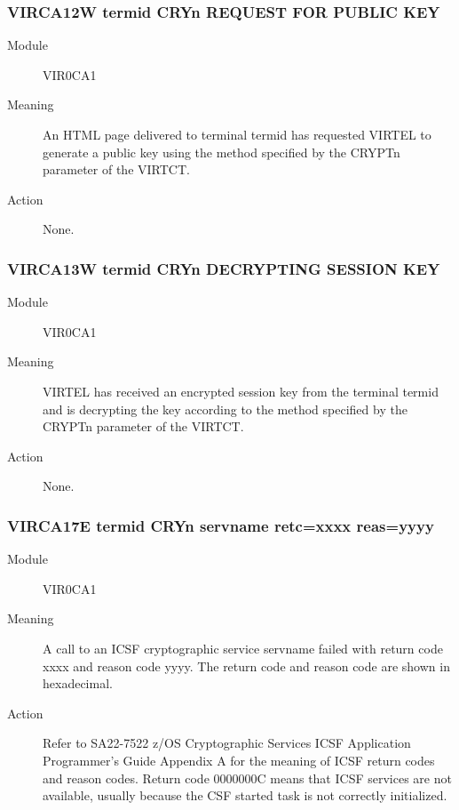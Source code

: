 \documentclass[letterpaper,10pt,english]{sphinxmanual}
\begin{document}
\subsubsection{VIRCA12W termid CRYn REQUEST FOR PUBLIC KEY}
\label{\detokenize{messages:virca12w-termid-cryn-request-for-public-key}}\begin{description}
\item[{Module}] \leavevmode
VIR0CA1

\item[{Meaning}] \leavevmode
An HTML page delivered to terminal termid has requested VIRTEL to generate a public key using the method specified by the CRYPTn parameter of the VIRTCT.

\item[{Action}] \leavevmode
None.

\end{description}


\subsubsection{VIRCA13W termid CRYn DECRYPTING SESSION KEY}
\label{\detokenize{messages:virca13w-termid-cryn-decrypting-session-key}}\begin{description}
\item[{Module}] \leavevmode
VIR0CA1

\item[{Meaning}] \leavevmode
VIRTEL has received an encrypted session key from the terminal termid and is decrypting the key according to the method specified by the CRYPTn parameter of the VIRTCT.

\item[{Action}] \leavevmode
None.

\end{description}


\subsubsection{VIRCA17E termid CRYn  servname retc=xxxx reas=yyyy}
\label{\detokenize{messages:virca17e-termid-cryn-error-servname-retc-xxxx-reas-yyyy}}\begin{description}
\item[{Module}] \leavevmode
VIR0CA1

\item[{Meaning}] \leavevmode
A call to an ICSF cryptographic service servname failed with return code xxxx and reason code yyyy. The return code and reason code are shown in hexadecimal.

\item[{Action}] \leavevmode
Refer to SA22-7522 z/OS Cryptographic Services ICSF Application Programmer’s Guide Appendix A for the meaning of ICSF return codes and reason codes. Return code 0000000C means that ICSF services are not available, usually because the CSF started task is not correctly initialized.

\end{description}
\end{document}
